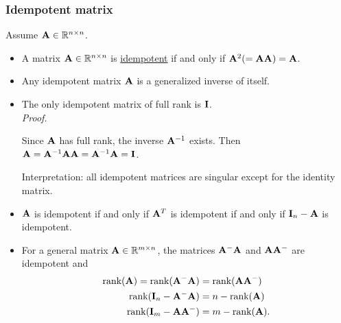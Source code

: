 \subsubsection*{Idempotent matrix}
Assume $\mathbf{A} \in \mathbb{R}^{n \times n}$.
\begin{itemize}
	\item A matrix $\mathbf{A} \in \mathbb{R}^{n \times n}$ is \underline{idempotent} if and only if $\mathbf{A}^2 (= \mathbf{AA}) = \mathbf{A}$.
	\item Any idempotent matrix $\mathbf{A}$ is a generalized inverse of itself.
	\item The only idempotent matrix of full rank is $\mathbf{I}$.\\
	{\it Proof.} 
	\begin{pf}
		Since $\mathbf{A}$ has full rank, the inverse $\mathbf{A}^{-1}$ exists.  Then $\mathbf{A} = \mathbf{A}^{-1}\mathbf{AA} = \mathbf{A}^{-1} \mathbf{A} = \mathbf{I}$.
	\end{pf}
	Interpretation: all idempotent matrices are singular except for the identity matrix.
	\item $\mathbf{A}$ is idempotent if and only if $\mathbf{A}^T$ is idempotent if and only if $\mathbf{I}_n - \mathbf{A}$ is idempotent.
	\item For a general matrix $\mathbf{A} \in \mathbb{R}^{m \times n}$, the matrices $\mathbf{A}^{-} \mathbf{A}$ and $\mathbf{A}\mathbf{A}^{-} $ are idempotent and
	$$
	\begin{aligned}
		\mbox{rank}(\mathbf{A}) = \mbox{rank}(\mathbf{A}^{-} \mathbf{A}) &= \mbox{rank}(\mathbf{A} \mathbf{A}^{-} )\\
		\mbox{rank}(\mathbf{I}_n - \mathbf{A}^{-} \mathbf{A}) &= n - \mbox{rank}(\mathbf{A})\\
		\mbox{rank}(\mathbf{I}_m - \mathbf{A} \mathbf{A}^{-}) &= m - \mbox{rank}(\mathbf{A}).\\
	\end{aligned}
	$$
\end{itemize}
















